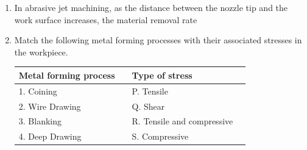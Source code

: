 \documentclass[journal,12pt,onecolumn]{IEEEtran}
\begin{document}
\begin{enumerate}

    \item In abrasive jet machining, as the distance between the nozzle tip and the work surface increases, the material removal rate

          \begin{enumerate}
          \end{enumerate}

    \item Match the following metal forming processes with their associated stresses in the workpiece.

          \begin{table}[H]
              \centering
              \begin{tabular}{|l|l|l|l|}
                  \hline
                  \textbf{Metal forming process} &  & \textbf{Type of stress}    & \\
                  \hline
                  1. Coining                     &  & P. Tensile                 & \\
                  2. Wire Drawing                &  & Q. Shear                   & \\
                  3. Blanking                    &  & R. Tensile and compressive & \\
                  4. Deep Drawing                &  & S. Compressive             & \\
                  \hline
              \end{tabular}
          \end{table}

          \begin{enumerate}
          \end{enumerate}


\end{enumerate}
\end{document}
